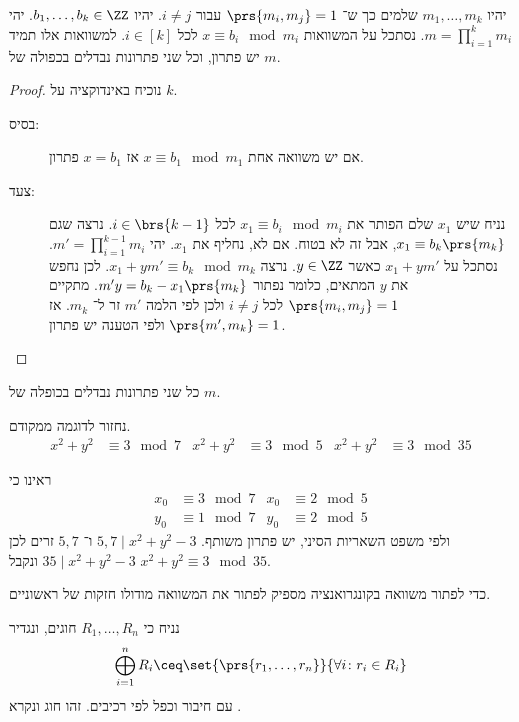 \documentclass[a4paper,10pt,twoside,openany]{book}
\begin{document}
\begin{theorem}
יהיו
$m_1, \ldots, m_k$
שלמים כך ש־%
$\prs{m_i, m_j} = 1$
עבור
$i \neq j$.
יהיו
$b_1,\ldots,b_k \in \ZZ$.
יהי
$m = \prod_{i=1}^k m_i$.
נסתכל על המשוואות
$x \equiv b_i \mod{m_i}$
לכל
$i \in [k]$.
למשוואות אלו תמיד יש פתרון, וכל שני פתרונות נבדלים בכפולה של
$m$.
\end{theorem}
\begin{proof}
נוכיח באינדוקציה על
$k$.
\begin{description}
\item[בסיס:]
אם יש משוואה אחת
$x \equiv b_1 \mod{m_1}$
אז
$x = b_1$
פתרון.
\item[צעד:]
נניח שיש
$x_1$
שלם הפותר את
$x_1 \equiv b_i \mod{m_i}$
לכל
$i \in \brs{k-1}$.
נרצה שגם
$x_1 \equiv b_k \prs{m_k}$,
אבל זה לא בטוח. אם לא, נחליף את
$x_1$.
יהי
$m' = \prod_{i=1}^{k-1} m_i$.
נסתכל על
$x_1 + ym'$
כאשר
$y \in \ZZ$.
נרצה
$x_1 + ym' \equiv b_k \mod{m_k}$.
לכן נחפש את
$y$
המתאים, כלומר נפתור
$m'y = b_k - x_1\prs{m_k}$.
מתקיים
$\prs{m_i, m_j} = 1$
לכל
$i \neq j$
ולכן לפי הלמה
$m'$
זר ל־%
$m_k$.
אז
$\prs{m',m_k} = 1$
ולפי הטענה יש פתרון.
\end{description}
\end{proof}

\begin{exercise}
כל שני פתרונות נבדלים בכופלה של
$m$.
\end{exercise}

נחזור לדוגמה ממקודם.
\begin{align*}
x^2 + y^2 &\equiv 3 \mod{7} & x^2 + y^2 &\equiv 3 \mod{5} & x^2 + y^2 &\equiv 3 \mod{35} 
\end{align*}

\begin{example}
ראינו כי
\begin{align*}
x_0 &\equiv 3 \mod{7} & x_0 &\equiv 2 \mod{5} \\
y_0 &\equiv 1 \mod{7} & y_0 &\equiv 2 \mod{5}
\end{align*}
ולפי משפט השאריות הסיני, יש פתרון משותף.
$5,7 \mid x^2 + y^2 - 3$
ו־%
$5,7$
זרים לכן
$35 \mid x^2 + y^2 - 3$
ונקבל
$x^2 + y^2 \equiv 3\mod{35}$.
\end{example}

\begin{corollary}
כדי לפתור משוואה בקונגרואנציה מספיק לפתור את המשוואה מודולו חזקות של ראשוניים.
\end{corollary}

\begin{definition}
נניח כי
$R_1, \ldots, R_n$
חוגים, ונגדיר
\[\bigoplus_{i=1}^n R_i \ceq \set{\prs{r_1, \ldots, r_n}}{\forall i\colon r_i \in R_i}\]
עם חיבור וכפל לפי רכיבים.
זהו חוג ונקרא
.
\end{definition}
\end{document}
